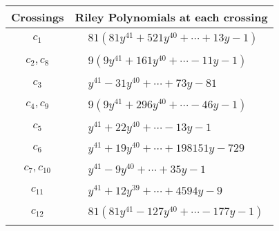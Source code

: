 \documentclass[1p]{elsarticle_modified}
\theoremstyle{definition}
\begin{document}
\begin{tabular}{m{50pt}|m{274pt}}
Crossings & \hspace{64pt}Riley Polynomials at each crossing \\
\hline $$\begin{aligned}c_{1}\end{aligned}$$&$\begin{aligned}
&81(81 y^{41}+521 y^{40}+\cdots+13 y-1)
\end{aligned}$\\
\hline $$\begin{aligned}c_{2},c_{8}\end{aligned}$$&$\begin{aligned}
&9(9 y^{41}+161 y^{40}+\cdots-11 y-1)
\end{aligned}$\\
\hline $$\begin{aligned}c_{3}\end{aligned}$$&$\begin{aligned}
&y^{41}-31 y^{40}+\cdots+73 y-81
\end{aligned}$\\
\hline $$\begin{aligned}c_{4},c_{9}\end{aligned}$$&$\begin{aligned}
&9(9 y^{41}+296 y^{40}+\cdots-46 y-1)
\end{aligned}$\\
\hline $$\begin{aligned}c_{5}\end{aligned}$$&$\begin{aligned}
&y^{41}+22 y^{40}+\cdots-13 y-1
\end{aligned}$\\
\hline $$\begin{aligned}c_{6}\end{aligned}$$&$\begin{aligned}
&y^{41}+19 y^{40}+\cdots+198151 y-729
\end{aligned}$\\
\hline $$\begin{aligned}c_{7},c_{10}\end{aligned}$$&$\begin{aligned}
&y^{41}-9 y^{40}+\cdots+35 y-1
\end{aligned}$\\
\hline $$\begin{aligned}c_{11}\end{aligned}$$&$\begin{aligned}
&y^{41}+12 y^{39}+\cdots+4594 y-9
\end{aligned}$\\
\hline $$\begin{aligned}c_{12}\end{aligned}$$&$\begin{aligned}
&81(81 y^{41}-127 y^{40}+\cdots-177 y-1)
\end{aligned}$\\
\hline
\end{tabular}\\~\\
\end{document}
